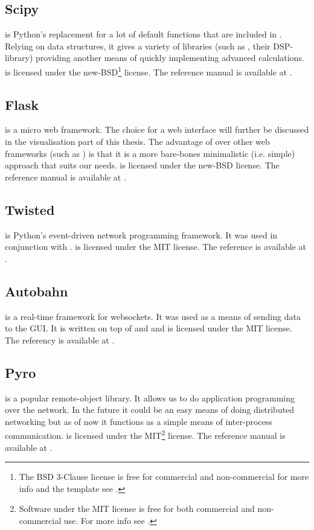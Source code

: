 \documentclass[a4paper, openany, oneside]{memoir}
\begin{document}
\subsection{Scipy}
\label{sec:scipy}
 is Python's replacement for a lot of default functions that are included in \matlab{}. Relying on  data structures, it gives a variety of libraries (such as , their DSP-library) providing another means of quickly implementing advanced calculations.  is licensed under the new-BSD\footnote{\label{fn:bsd}The BSD 3-Clause license is free for commercial and non-commercial for more info and the template see \cite{bsdlic}.} license. The reference manual is available at \cite{numpyscipy}.

\subsection{Flask}
\label{sec:flask}
 is a micro web framework. The choice for a web interface will further be discussed in the visualisation part of this thesis. The advantage of  over other web frameworks (such as ) is that it is a more bare-bones minimalistic (i.e. simple) approach that suits our needs.  is licensed under the new-BSD license. The reference manual is available at \cite{flask}.

\subsection{Twisted}
\label{sub:twisted}
 is Python's event-driven network programming framework. It was used in conjunction with .  is licensed under the MIT license. The reference is available at \cite{twisted}.

\subsection{Autobahn}
\label{sub:autobahn}
 is a real-time framework for websockets. It was used as a means of sending data to the GUI. It is written on top of  and  and is licensed under the MIT license. The referency is available at \cite{autobahn}.

\subsection{Pyro}
\label{sec:pyro}
 is a popular remote-object library. It allows us to do application programming over the network. In the future it could be an easy means of doing distributed networking but as of now it functions as a simple means of inter-process communication.  is licensed under the MIT\footnote{\label{fn:mit}Software under the MIT license is free for both commercial and non-commercial use. For more info see \cite{mitlic}.} license. The reference manual is available at \cite{pyro4}.
\end{document}
